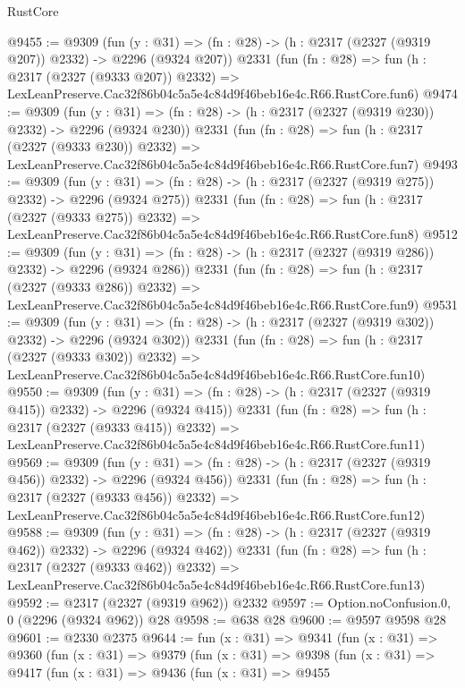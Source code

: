 \begin{lexlean}{RustCore}
\begin{coremodule}
@9455 := @9309
    (fun (y : @31) => (fn : @28) -> (h : @2317 (@2327 (@9319 @207)) @2332) -> @2296 (@9324 @207))
    @2331
    (fun (fn : @28) =>
    fun (h : @2317 (@2327 (@9333 @207)) @2332) =>
    LexLeanPreserve.Cac32f86b04c5a5e4c84d9f46beb16e4c.R66.RustCore.fun6)
@9474 := @9309
    (fun (y : @31) => (fn : @28) -> (h : @2317 (@2327 (@9319 @230)) @2332) -> @2296 (@9324 @230))
    @2331
    (fun (fn : @28) =>
    fun (h : @2317 (@2327 (@9333 @230)) @2332) =>
    LexLeanPreserve.Cac32f86b04c5a5e4c84d9f46beb16e4c.R66.RustCore.fun7)
@9493 := @9309
    (fun (y : @31) => (fn : @28) -> (h : @2317 (@2327 (@9319 @275)) @2332) -> @2296 (@9324 @275))
    @2331
    (fun (fn : @28) =>
    fun (h : @2317 (@2327 (@9333 @275)) @2332) =>
    LexLeanPreserve.Cac32f86b04c5a5e4c84d9f46beb16e4c.R66.RustCore.fun8)
@9512 := @9309
    (fun (y : @31) => (fn : @28) -> (h : @2317 (@2327 (@9319 @286)) @2332) -> @2296 (@9324 @286))
    @2331
    (fun (fn : @28) =>
    fun (h : @2317 (@2327 (@9333 @286)) @2332) =>
    LexLeanPreserve.Cac32f86b04c5a5e4c84d9f46beb16e4c.R66.RustCore.fun9)
@9531 := @9309
    (fun (y : @31) => (fn : @28) -> (h : @2317 (@2327 (@9319 @302)) @2332) -> @2296 (@9324 @302))
    @2331
    (fun (fn : @28) =>
    fun (h : @2317 (@2327 (@9333 @302)) @2332) =>
    LexLeanPreserve.Cac32f86b04c5a5e4c84d9f46beb16e4c.R66.RustCore.fun10)
@9550 := @9309
    (fun (y : @31) => (fn : @28) -> (h : @2317 (@2327 (@9319 @415)) @2332) -> @2296 (@9324 @415))
    @2331
    (fun (fn : @28) =>
    fun (h : @2317 (@2327 (@9333 @415)) @2332) =>
    LexLeanPreserve.Cac32f86b04c5a5e4c84d9f46beb16e4c.R66.RustCore.fun11)
@9569 := @9309
    (fun (y : @31) => (fn : @28) -> (h : @2317 (@2327 (@9319 @456)) @2332) -> @2296 (@9324 @456))
    @2331
    (fun (fn : @28) =>
    fun (h : @2317 (@2327 (@9333 @456)) @2332) =>
    LexLeanPreserve.Cac32f86b04c5a5e4c84d9f46beb16e4c.R66.RustCore.fun12)
@9588 := @9309
    (fun (y : @31) => (fn : @28) -> (h : @2317 (@2327 (@9319 @462)) @2332) -> @2296 (@9324 @462))
    @2331
    (fun (fn : @28) =>
    fun (h : @2317 (@2327 (@9333 @462)) @2332) =>
    LexLeanPreserve.Cac32f86b04c5a5e4c84d9f46beb16e4c.R66.RustCore.fun13)
@9592 := @2317 (@2327 (@9319 @962)) @2332
@9597 := Option.noConfusion.{0, 0} (@2296 (@9324 @962)) @28
@9598 := @638 @28
@9600 := @9597 @9598 @28
@9601 := @2330 @2375
@9644 := fun (x : @31) =>
  @9341
    (fun (x : @31) =>
    @9360
      (fun (x : @31) =>
      @9379
        (fun (x : @31) =>
        @9398
          (fun (x : @31) =>
          @9417
            (fun (x : @31) =>
            @9436
              (fun (x : @31) =>
              @9455

\end{coremodule}
\end{lexlean}
